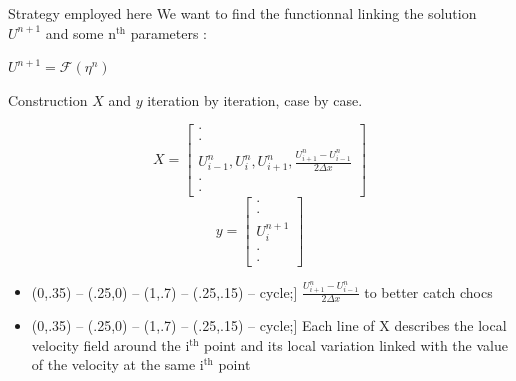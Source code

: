 \documentclass[10pt,
			   xcolor=svgnames,
			   hyperref={linkcolor=red, citecolor = DarkGreen, colorlinks=true, urlcolor=Navy}]{beamer}
\def\checkmark{\tikz\fill[scale=0.4](0,.35) -- (.25,0) -- (1,.7) -- (.25,.15) -- cycle;}
\newcommand{\bepar}[1]{
	\left( #1 \right)  
}
\begin{document}
\begin{frame}{Strategy employed here}
	We want to find the functionnal linking the solution $U^{n+1}$ and some n$^{\text{th}}$ parameters :\\
	\begin{center}
	$ \displaystyle U^{n+1} = \mathcal{F}\bepar{\eta^n}$ \\
	\end{center}
	Construction $X$ and $y$ iteration by iteration, case by case.\\

	\begin{multicols}{2}
	\noindent
	$$ X = \left[ \begin{array}{c} \cdot \\ \cdot \\ U^n_{i-1},U^n_{i}, U^n_{i+1}, \frac{U^n_{i+1} - U^n_{i-1}}{2\Delta x}  \\ \cdot \\ \cdot
				  \end{array}
		   \right]
	$$
	\columnbreak
	$$ y = \left[ \begin{array}{c} \cdot \\ \cdot \\ U^{n+1}_i \\ \cdot \\ \cdot
			  \end{array}
	   \right]
	$$
	\end{multicols}
	
	\begin{itemize}
		\item[\checkmark] $\displaystyle \frac{U^n_{i+1} - U^n_{i-1}}{2\Delta x}$ to better catch chocs \\
		\item[\checkmark] Each line of X describes the local velocity field around the i$^{\text{th}}$ point and its local variation linked with the value of the velocity at the same i$^{\text{th}}$ point
	\end{itemize}		
	
\end{frame}
\end{document}
